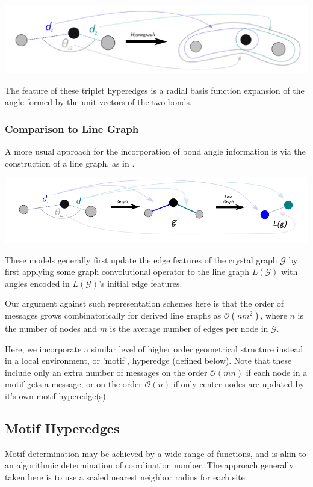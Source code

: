 \documentclass[10pt,a4paper]{article}
\begin{document}
\begin{center}
\includegraphics[scale=0.32]{triplet_ex.pdf}
\end{center}
The feature of these triplet hyperedges is a radial basis function expansion of the angle formed by the unit vectors of the two bonds.

\subsubsection{Comparison to Line Graph}
A more usual approach for the incorporation of bond angle information is via the construction of a line graph, as in \cite{alignn, m3gnet}. 
\begin{center}
\includegraphics[scale=0.7]{line_graph_ex.pdf}
\end{center}
These models generally first update the edge features of the crystal graph $\mathcal{G}$ by first applying some graph convolutional operator to the line graph $L(\mathcal{G})$ with angles encoded in  $L(\mathcal{G})$'s initial edge features.

Our argument against such representation schemes here is that the order of messages grows combinatorically for derived line graphs as $\mathcal{O}(nm^2)$, where $n$ is the number of nodes and $m$ is the average number of edges per node in $\mathcal{G}$.

Here, we incorporate a similar level of higher order geometrical structure instead in a local environment, or 'motif', hyperedge (defined below). Note that these include only an extra number of messages on the order $\mathcal{O}(mn)$ if each node in a motif gets a message, or on the order $\mathcal{O}(n)$ if only center nodes are updated by it's own motif hyperedge(s).

\subsection{Motif Hyperedges}
Motif determination may be achieved by a wide range of functions, and is akin to an algorithmic determination of coordination number. The approach generally taken here is to use a scaled nearest neighbor radius for each site.
\end{document}
